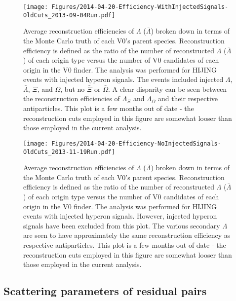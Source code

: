 \begin{figure}[hbtp]
\texttt{[image: Figures/2014-04-20-Efficiency-WithInjectedSignals-OldCuts\_2013-09-04Run.pdf]}
\caption[$Lambda$ reconstruction efficiencies with injected signals]{Average reconstruction efficiencies of $\Lambda$ ($\bar{\Lambda}$) broken down in terms of the Monte Carlo truth of each V0's parent species.  
Reconstruction efficiency is defined as the ratio of the number of reconstructed $\Lambda$ ($\bar{\Lambda}$) of each origin type versus the number of V0 candidates of each origin in the V0 finder.  
The analysis was performed for HIJING events with injected hyperon signals.  
The events included injected $\Lambda$, $\bar{\Lambda}$, $\Xi$, and $\Omega$, but no $\bar{\Xi}$ or $\bar{\Omega}$.  
A clear disparity can be seen between the reconstruction efficiencies of $\Lambda_{\Xi}$ and $\Lambda_{\Omega}$ and their respective antiparticles.  
This plot is a few months out of date - the reconstruction cuts employed in this figure are somewhat looser than those employed in the current analysis.}
\label{fig:MCEfficiencyWithInjected}
\end{figure}

\begin{figure}[hbtp]
\texttt{[image: Figures/2014-04-20-Efficiency-NoInjectedSignals-OldCuts\_2013-11-19Run.pdf]}
\caption[$Lambda$ reconstruction efficiencies without injected signals]{Average reconstruction efficiencies of $\Lambda$ ($\bar{\Lambda}$) broken down in terms of the Monte Carlo truth of each V0's parent species.  
Reconstruction efficiency is defined as the ratio of the number of reconstructed $\Lambda$ ($\bar{\Lambda}$) of each origin type versus the number of V0 candidates of each origin in the V0 finder.  
The analysis was performed for HIJING events with injected hyperon signals.  
However, injected hyperon signals have been excluded from this plot.  
The various secondary $\Lambda$ are seen to have approximately the same reconstruction efficiency as respective antiparticles.  
This plot is a few months out of date - the reconstruction cuts employed in this figure are somewhat looser than those employed in the current analysis.}
\label{fig:MCEfficiencyNoInjected}
\end{figure}

\subsection{Scattering parameters of residual pairs}
\label{sec:ScatteringParams}

